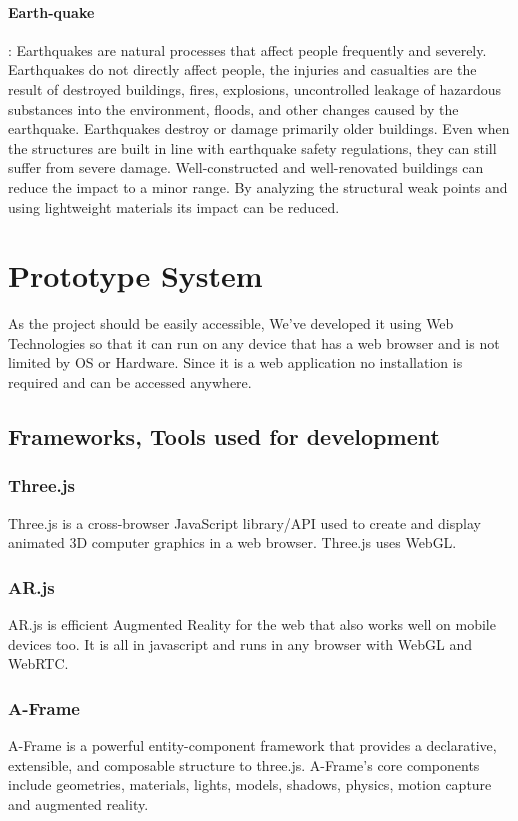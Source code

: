 \documentclass[conference]{IEEEtran}
\begin{document}
\paragraph{Earth-quake}: Earthquakes are natural processes that affect people frequently and severely. Earthquakes do not directly affect people, the injuries and casualties are the result of destroyed buildings, fires, explosions, uncontrolled leakage of hazardous substances into the environment, floods, and other changes caused by the earthquake. Earthquakes destroy or damage primarily older buildings. Even when the structures are built in line with earthquake safety regulations, they can still suffer from severe damage. Well-constructed and well-renovated buildings can reduce the impact to a minor range. By analyzing the structural weak points and using lightweight materials its impact can be reduced.

\section{Prototype System}
As the project should be easily accessible, We've developed it using Web Technologies so that it can run on any device that has a web browser and is not limited by OS or Hardware.
Since it is a web application no installation is required and can be accessed anywhere.

\subsection{Frameworks, Tools used for development}
\subsubsection{Three.js} Three.js is a cross-browser JavaScript library/API used to create and display animated 3D computer graphics in a web browser. Three.js uses WebGL.
\subsubsection{AR.js}AR.js is efficient Augmented Reality for the web that also works well on mobile devices too. It is all in javascript and runs in any browser with WebGL and WebRTC. 
\subsubsection{A-Frame} A-Frame is a powerful entity-component framework that provides a declarative, extensible, and composable structure to three.js.
A-Frame’s core components include geometries, materials, lights, models, shadows, physics, motion capture and augmented reality.
\end{document}
